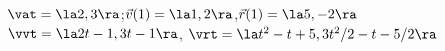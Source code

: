 {$\vat = \la 2,3\ra$;\quad $\vec v(1) = \la 1,2\ra$,\quad $\vec r(1) = \la 5,-2\ra$
}
{$\vvt = \la 2t-1,3t-1\ra$, $\vrt = \la t^2-t+5,3t^2/2-t-5/2\ra$
}